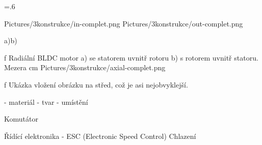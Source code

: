  \medskip
\picw=.6\hsize
{} %
\centerline {\inspic Pictures/3konstrukce/in-complet.png \hfil\hfil \inspic Pictures/3konstrukce/out-complet.png }\nobreak
\centerline {a)\hfil\hfil b)}\nobreak\medskip
\caption/f Radiální BLDC motor a) se statorem uvnitř rotoru b) s rotorem uvnitř statoru.
 \medskip
Mezera 
 \medskip
{} cm \cinspic Pictures/3konstrukce/axial-complet.png 
\caption/f Ukázka vložení obrázku na střed, což je asi nejobvyklejší.
\medskip

- materiál
- tvar
- umístění

 \sec Komutátor

 \sec Řídící elektronika
 - ESC (Electronic Speed Control)
 \sec Chlazení

 